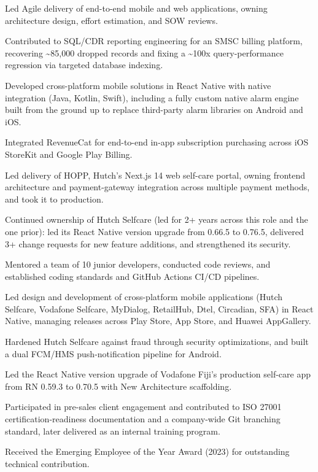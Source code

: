 \documentclass[10.5pt]{article}
\begin{document}
\begin{cvitems}
  \item Led Agile delivery of end-to-end mobile and web applications, owning architecture design, effort estimation, and SOW reviews.
  \item Contributed to SQL/CDR reporting engineering for an SMSC billing platform, recovering \textasciitilde85,000 dropped records and fixing a \textasciitilde100x query-performance regression via targeted database indexing.
  \item Developed cross-platform mobile solutions in React Native with native integration (Java, Kotlin, Swift), including a fully custom native alarm engine built from the ground up to replace third-party alarm libraries on Android and iOS.
  \item Integrated RevenueCat for end-to-end in-app subscription purchasing across iOS StoreKit and Google Play Billing.
  \item Led delivery of HOPP, Hutch's Next.js 14 web self-care portal, owning frontend architecture and payment-gateway integration across multiple payment methods, and took it to production.
  \item Continued ownership of Hutch Selfcare (led for 2+ years across this role and the one prior): led its React Native version upgrade from 0.66.5 to 0.76.5, delivered 3+ change requests for new feature additions, and strengthened its security.
  \item Mentored a team of 10 junior developers, conducted code reviews, and established coding standards and GitHub Actions CI/CD pipelines.
\end{cvitems}

\begin{cvitems}
  \item Led design and development of cross-platform mobile applications (Hutch Selfcare, Vodafone Selfcare, MyDialog, RetailHub, Dtel, Circadian, SFA) in React Native, managing releases across Play Store, App Store, and Huawei AppGallery.
  \item Hardened Hutch Selfcare against fraud through security optimizations, and built a dual FCM/HMS push-notification pipeline for Android.
  \item Led the React Native version upgrade of Vodafone Fiji's production self-care app from RN 0.59.3 to 0.70.5 with New Architecture scaffolding.
  \item Participated in pre-sales client engagement and contributed to ISO 27001 certification-readiness documentation and a company-wide Git branching standard, later delivered as an internal training program.
  \item Received the Emerging Employee of the Year Award (2023) for outstanding technical contribution.
\end{cvitems}
\end{document}

